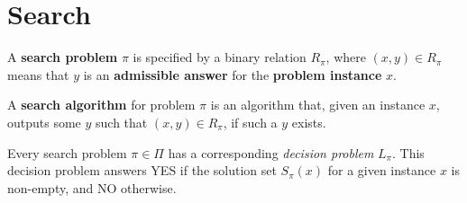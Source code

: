 \chapter{Search}

\begin{defn}\label{search_problem}
A \textbf{search problem} \(\pi\) is specified by a binary relation
\( R_\pi\), where \((x,y) \in R_\pi\)
means that \( y \) is an \textbf{admissible answer} for the \textbf{problem instance} 
\( x \).
\end{defn}

\begin{defn}\label{search_algorithm}
A \textbf{search algorithm} for problem \(\pi\) is an algorithm that,
given an instance \( x \), outputs some \( y \) such that \((x,y) \in R_\pi\),
if such a \( y \) exists.
\end{defn}

\begin{remark}
Every search problem \(\pi \in \Pi\) has a corresponding \emph{decision 
problem} \(L_\pi\). This decision problem answers YES if the solution set 
\(S_{\pi}(x)\) for a given instance \(x\) is non-empty, and NO otherwise.
\end{remark}

